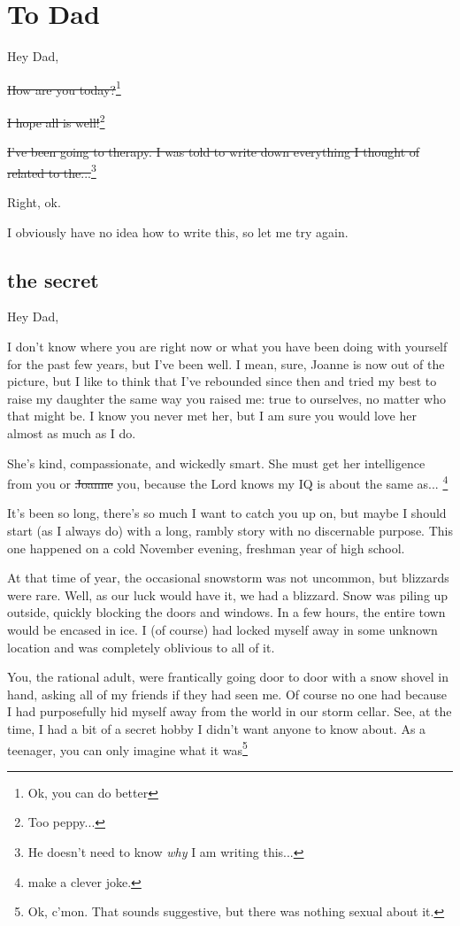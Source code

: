 \chapter{To Dad}

\noindent Hey Dad,

\sout{How are you today?}\footnote{Ok, you can do better}

\sout{I hope all is well!}\footnote{Too peppy...}

\sout{I've been going to therapy. I was told to write down everything I thought of related to the...}\footnote{He doesn't need to know \textit{why} I am writing this...}

Right, ok.

I obviously have no idea how to write this, so let me try again.

\newpage

\section*{the secret}

\noindent Hey Dad,

I don't know where you are right now or what you have been doing with yourself for the past few years, but I've been well.
I mean, sure, Joanne is now out of the picture, but I like to think that I've rebounded since then and tried my best to raise my daughter the same way you raised me: true to ourselves, no matter who that might be.
I know you never met her, but I am sure you would love her almost as much as I do.

She's kind, compassionate, and wickedly smart.
She must get her intelligence from you or \sout{Joanne} you, because the Lord knows my IQ is about the same as... \footnote{make a clever joke.} 

It's been so long, there's so much I want to catch you up on, but maybe I should start (as I always do) with a long, rambly story with no discernable purpose.
This one happened on a cold November evening, freshman year of high school.

At that time of year, the occasional snowstorm was not uncommon, but blizzards were rare.
Well, as our luck would have it, we had a blizzard.
Snow was piling up outside, quickly blocking the doors and windows.
In a few hours, the entire town would be encased in ice.
I (of course) had locked myself away in some unknown location and was completely oblivious to all of it.

You, the rational adult, were frantically going door to door with a snow shovel in hand, asking all of my friends if they had seen me.
Of course no one had because I had purposefully hid myself away from the world in our storm cellar.
See, at the time, I had a bit of a secret hobby I didn't want anyone to know about.
As a teenager, you can only imagine what it was\footnote{Ok, c'mon. That sounds suggestive, but there was nothing sexual about it.}

